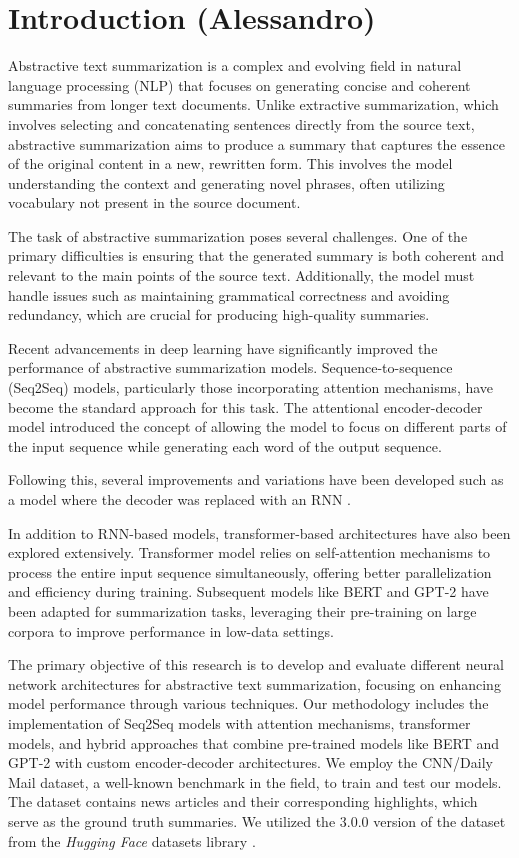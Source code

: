 \section{Introduction (Alessandro)}
Abstractive text summarization is a complex and evolving field in natural language processing (NLP) that focuses on generating concise and coherent summaries from longer text documents. Unlike extractive summarization, which involves selecting and concatenating sentences directly from the source text, abstractive summarization aims to produce a summary that captures the essence of the original content in a new, rewritten form. This involves the model understanding the context and generating novel phrases, often utilizing vocabulary not present in the source document.

The task of abstractive summarization poses several challenges. One of the primary difficulties is ensuring that the generated summary is both coherent and relevant to the main points of the source text. Additionally, the model must handle issues such as maintaining grammatical correctness and avoiding redundancy, which are crucial for producing high-quality summaries.

Recent advancements in deep learning have significantly improved the performance of abstractive summarization models. Sequence-to-sequence (Seq2Seq) models, particularly those incorporating attention mechanisms, have become the standard approach for this task. The attentional encoder-decoder model \cite{bahdanau2014neural} introduced the concept of allowing the model to focus on different parts of the input sequence while generating each word of the output sequence.

Following this, several improvements and variations have been developed such as a model where the decoder was replaced with an RNN \cite{Chopra2016AbstractiveSS}. 

In addition to RNN-based models, transformer-based architectures have also been explored extensively. Transformer model \cite{transformer} relies on self-attention mechanisms to process the entire input sequence simultaneously, offering better parallelization and efficiency during training. Subsequent models like BERT \cite{devlin2018bert} and GPT-2 \cite{radford2019language} have been adapted for summarization tasks, leveraging their pre-training on large corpora to improve performance in low-data settings.

The primary objective of this research is to develop and evaluate different neural network architectures for abstractive text summarization, focusing on enhancing model performance through various techniques. Our methodology includes the implementation of Seq2Seq models with attention mechanisms, transformer models, and hybrid approaches that combine pre-trained models like BERT and GPT-2 with custom encoder-decoder architectures. We employ the CNN/Daily Mail dataset, a well-known benchmark in the field, to train and test our models. The dataset contains news articles and their corresponding highlights, which serve as the ground truth summaries. We utilized the 3.0.0 version of the dataset from the \textit{Hugging Face} datasets library \cite{huggingface_cnn_dailymail}.

